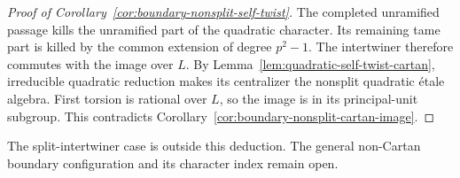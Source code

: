 \begin{proof}[Proof of Corollary~\ref{cor:boundary-nonsplit-self-twist}]
The completed unramified passage kills the unramified part of the
quadratic character. Its remaining tame part is killed by the
common extension of degree $p^2-1$. The intertwiner therefore
commutes with the image over $L$. By
Lemma~\ref{lem:quadratic-self-twist-cartan}, irreducible quadratic
reduction makes its centralizer the nonsplit quadratic \'etale
algebra. First torsion is rational over $L$, so the image is in
its principal-unit subgroup. This contradicts
Corollary~\ref{cor:boundary-nonsplit-cartan-image}.
\end{proof}

The split-intertwiner case is outside this deduction. The general
non-Cartan boundary configuration and its character index remain
open.
